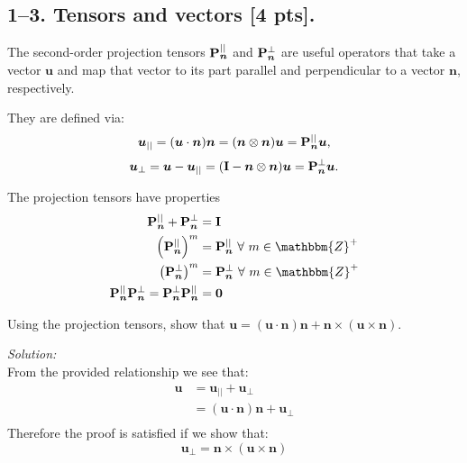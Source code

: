 \subsection*{1--3. \textbf{Tensors and vectors} [4 pts].}
The second-order projection tensors $\mathbf{P}_{\bm{n}}^{||}$ and $\mathbf{P}_{\bm{n}}^{\perp}$ are useful operators that take a vector $\bm{u}$ and map that vector to its part parallel and perpendicular to a vector $\bm{n}$, respectively. 

They are defined via:
\begin{equation*}
    \bm{u}_{||} = (\bm{u} \cdot \bm{n}) \bm{n} = (\bm{n} \otimes \bm{n}) \bm{u} = \mathbf{P}_{\bm{n}}^{||} \bm{u},
\end{equation*}
\begin{equation*}
    \bm{u}_{\perp} = \bm{u} - \bm{u}_{||} = (\mathbf{I} - \bm{n} \otimes \bm{n}) \bm{u} = \mathbf{P}_{\bm{n}}^{\perp} \bm{u}.
\end{equation*}

The projection tensors have properties
\begin{align*}
    \bn{P}_{\bm{n}}^{||} + \bn{P}_{\bm{n}}^{\perp} &= \bn{I} \\
    \left(\bn{P}_{\bm{n}}^{||} \right)^m &= \bn{P}_{\bm{n}}^{||} ~\forall ~m \in \mathbbm{Z}^+\\
    \left(\bn{P}_{\bm{n}}^{\perp} \right)^m &= \bn{P}_{\bm{n}}^{\perp} ~\forall ~m \in \mathbbm{Z}^+\\
    \bn{P}_{\bm{n}}^{||} \bn{P}_{\bm{n}}^{\perp} = \bn{P}_{\bm{n}}^{\perp} \bn{P}_{\bm{n}}^{||}  &= \bn{0}
\end{align*}

Using the projection tensors, show that $\bm{u} = (\bm{u} \cdot \bm{n}) \bm{n} + \bm{n} \times (\bm{u} \times \bm{n} )$.

\bigskip
\textit{Solution:} \\
From the provided relationship we see that: \\
\begin{align*}
\bm{u} &= \bm{u}_{||} + \bm{u}_{\perp} \\
&= (\bm{u} \cdot \bm{n}) \bm{n} + \bm{u}_{\perp} \\
\end{align*}
Therefore the proof is satisfied if we show that: 
\begin{equation*}
\bm{u}_{\perp} = \bm{n} \times (\bm{u} \times \bm{n})
\end{equation*}

